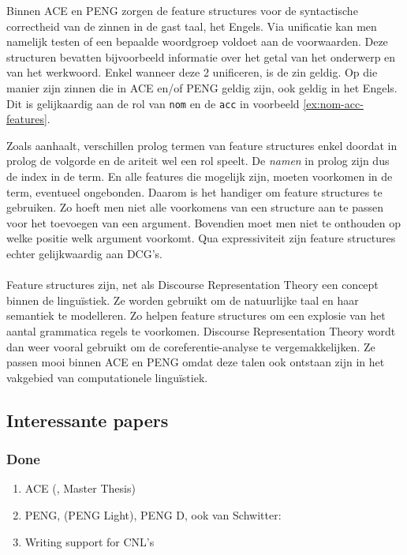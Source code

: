 \documentclass[]{article}
\theoremstyle{definition}
\begin{document}
Binnen ACE en PENG zorgen de feature structures voor de syntactische correctheid van de zinnen in de gast taal, het Engels. Via unificatie kan men namelijk testen of een bepaalde woordgroep voldoet aan de voorwaarden. Deze structuren bevatten bijvoorbeeld informatie over het getal van het onderwerp en van het werkwoord. Enkel wanneer deze 2 unificeren, is de zin geldig. Op die manier zijn zinnen die in ACE en/of PENG geldig zijn, ook geldig in het Engels. Dit is gelijkaardig aan de rol van \texttt{nom} en de \texttt{acc} in voorbeeld \ref{ex:nom-acc-features}.

Zoals \cite{Shieber2003} aanhaalt, verschillen prolog termen van feature structures enkel doordat in prolog de volgorde en de ariteit wel een rol speelt. De \textit{namen} in prolog zijn dus de index in de term. En alle features die mogelijk zijn, moeten voorkomen in de term, eventueel ongebonden. Daarom is het handiger om feature structures te gebruiken. Zo hoeft men niet alle voorkomens van een structure aan te passen voor het toevoegen van een argument. Bovendien moet men niet te onthouden op welke positie welk argument voorkomt. Qua expressiviteit zijn feature structures echter gelijkwaardig aan DCG's.

\paragraph{} Feature structures zijn, net als Discourse Representation Theory een concept binnen de linguïstiek. Ze worden gebruikt om de natuurlijke taal en haar semantiek te modelleren. Zo helpen feature structures om een explosie van het aantal grammatica regels te voorkomen. Discourse Representation Theory wordt dan weer vooral gebruikt om de coreferentie-analyse te vergemakkelijken. Ze passen mooi binnen ACE en PENG omdat deze talen ook ontstaan zijn in het vakgebied van computationele linguïstiek.



\subsection{Interessante papers}
\subsubsection{Done}
\begin{enumerate}
  \item ACE\cite{Fuchs2008} (\cite{Fuchs}, Master Thesis\cite{Dellis2010})
  \item PENG\cite{Schwitter2002, Schwitter2004b, Schwitter2003, Schwitter2006}, (PENG Light\cite{Schwitter2008, White2009}), PENG D\cite{Schwitter2004}, ook van Schwitter:\cite{Schwitter2005} 
  \item Writing support for CNL's\cite{Kuhn2008} 
\end{enumerate}
\end{document}
